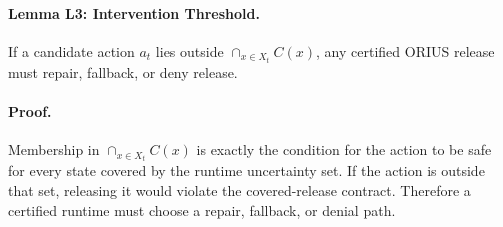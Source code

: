 \paragraph{Lemma L3: Intervention Threshold.}
If a candidate action \(a_t\) lies outside
\(\cap_{x\in X_t}C(x)\), any certified ORIUS release must repair, fallback, or
deny release.

\paragraph{Proof.}
Membership in \(\cap_{x\in X_t}C(x)\) is exactly the condition for the action to
be safe for every state covered by the runtime uncertainty set. If the action is
outside that set, releasing it would violate the covered-release contract.
Therefore a certified runtime must choose a repair, fallback, or denial path.
